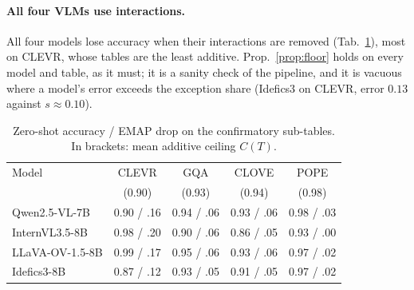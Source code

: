 \paragraph{All four VLMs use interactions.}
All four models lose accuracy when their interactions are removed (Tab.~\ref{tab:vlm_acc}), most on CLEVR, whose tables
are the least additive. Prop.~\ref{prop:floor} holds on every model and table, as it must; it is a sanity check of the
pipeline, and it is vacuous where a model's error exceeds the exception share (\eg Idefics3 on CLEVR, error $0.13$
against $s\approx0.10$).

\begin{table}[t]
\centering\small\setlength{\tabcolsep}{4pt}
\caption{Zero-shot accuracy / EMAP drop on the confirmatory sub-tables. In brackets: mean additive ceiling $C(T)$.}
\label{tab:vlm_acc}
\begin{tabular}{lcccc}
\toprule
Model & CLEVR & GQA & CLOVE & POPE \\
      & (0.90) & (0.93) & (0.94) & (0.98) \\
\midrule
Qwen2.5-VL-7B   & 0.90 / .16 & 0.94 / .06 & 0.93 / .06 & 0.98 / .03 \\
InternVL3.5-8B  & 0.98 / .20 & 0.90 / .06 & 0.86 / .05 & 0.93 / .00 \\
LLaVA-OV-1.5-8B & 0.99 / .17 & 0.95 / .06 & 0.93 / .06 & 0.97 / .02 \\
Idefics3-8B     & 0.87 / .12 & 0.93 / .05 & 0.91 / .05 & 0.97 / .02 \\
\bottomrule
\end{tabular}
\end{table}


